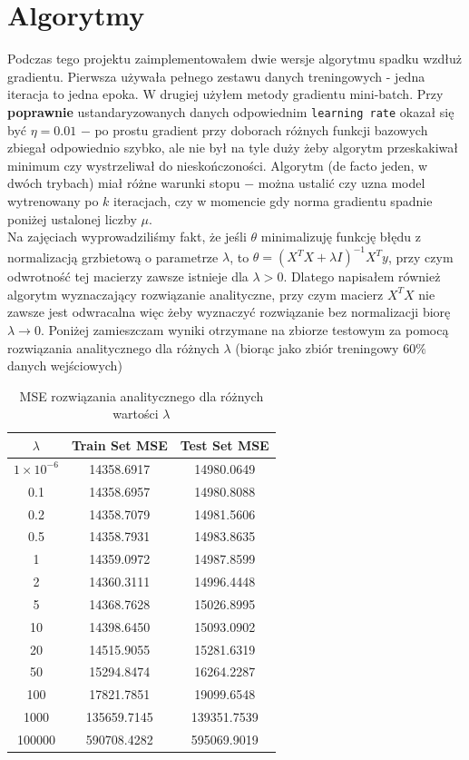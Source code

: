 \documentclass[polish,12pt,a4paper]{extarticle}
\begin{document}
\section*{Algorytmy}
Podczas tego projektu zaimplementowałem dwie wersje algorytmu spadku wzdłuż gradientu. Pierwsza używała
pełnego zestawu danych treningowych - jedna iteracja to jedna epoka. W drugiej użyłem metody gradientu mini-batch. Przy \textbf{poprawnie} ustandaryzowanych danych odpowiednim \texttt{learning rate} okazał się być $\eta = 0.01$ $-$ po prostu gradient przy doborach różnych funkcji bazowych zbiegał odpowiednio szybko, ale nie był na tyle duży żeby algorytm przeskakiwał minimum czy wystrzeliwał do nieskończoności. Algorytm (de facto jeden, w dwóch trybach) miał różne warunki stopu $-$ można ustalić czy uzna model wytrenowany po $k$ iteracjach, czy w momencie gdy norma gradientu spadnie poniżej ustalonej liczby $\mu$. \bigskip \\
Na zajęciach wyprowadziliśmy fakt, że jeśli $\theta$ minimalizuję funkcję błędu z normalizacją grzbietową o parametrze $\lambda$, to $\theta = (X^TX + \lambda I)^{-1} X^Ty$, przy czym odwrotność tej macierzy zawsze istnieje dla $\lambda > 0$. Dlatego napisałem również algorytm wyznaczający rozwiązanie analityczne, przy czym macierz $X^TX$ nie zawsze jest odwracalna więc żeby wyznaczyć rozwiązanie bez normalizacji biorę $\lambda \rightarrow 0$. Poniżej zamieszczam wyniki otrzymane na zbiorze testowym za pomocą rozwiązania analitycznego dla różnych $\lambda$ (biorąc jako zbiór treningowy $ 60\%$ danych wejściowych) \\
\begin{table}[h!]
\centering
\begin{tabular}{|c|c|c|}
\hline
\(\lambda\) & Train Set MSE & Test Set MSE \\
\hline
\(1 \times 10^{-6}\) & 14358.6917 & 14980.0649 \\
0.1                 & 14358.6957 & 14980.8088 \\
0.2                 & 14358.7079 & 14981.5606 \\
0.5                 & 14358.7931 & 14983.8635 \\
1                   & 14359.0972 & 14987.8599 \\
2                   & 14360.3111 & 14996.4448 \\
5                   & 14368.7628 & 15026.8995 \\
10                  & 14398.6450 & 15093.0902 \\
20                  & 14515.9055 & 15281.6319 \\
50                  & 15294.8474 & 16264.2287 \\
100                 & 17821.7851 & 19099.6548 \\
1000                & 135659.7145 & 139351.7539 \\
100000              & 590708.4282 & 595069.9019 \\
\hline
\end{tabular}
\caption{MSE rozwiązania analitycznego dla różnych wartości \(\lambda\)}
\end{table} \biskip \\
\end{document}
